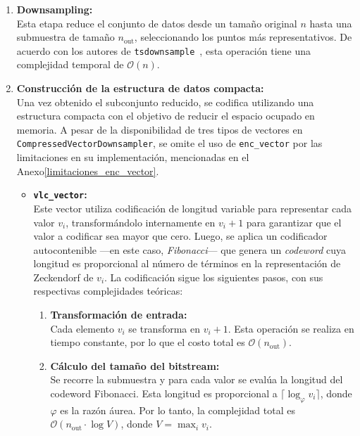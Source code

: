 \begin{enumerate}
    \item \textbf{Downsampling:} \\
    Esta etapa reduce el conjunto de datos desde un tamaño original \(n\) hasta una submuestra de tamaño \(n_{\text{out}}\), seleccionando los puntos más representativos. De acuerdo con los autores de \texttt{tsdownsample}~\cite{tsdownsample}, esta operación tiene una complejidad temporal de \(\mathcal{O}(n)\).

    \item \textbf{Construcción de la estructura de datos compacta:} \\
    Una vez obtenido el subconjunto reducido, se codifica utilizando una estructura compacta con el objetivo de reducir el espacio ocupado en memoria. A pesar de la disponibilidad de tres tipos de vectores en \texttt{CompressedVectorDownsampler}, se omite el uso de \texttt{enc\_vector} por las limitaciones en su implementación, mencionadas en el Anexo\ref{limitaciones_enc_vector}.

    \begin{itemize}
        \item \textbf{\texttt{vlc\_vector}:} \\[0.5em]
            Este vector utiliza codificación de longitud variable para representar cada valor \(v_i\), transformándolo internamente en \(v_i + 1\) para garantizar que el valor a codificar sea mayor que cero. Luego, se aplica un codificador autocontenible —en este caso, \textit{Fibonacci}— que genera un \textit{codeword} cuya longitud es proporcional al número de términos en la representación de Zeckendorf de \(v_i\). La codificación sigue los siguientes pasos, con sus respectivas complejidades teóricas:
            
            \begin{enumerate}
                \item \textbf{Transformación de entrada:} \\
                Cada elemento \(v_i\) se transforma en \(v_i + 1\). Esta operación se realiza en tiempo constante, por lo que el costo total es \(\mathcal{O}(n_{\text{out}})\).
            
                \item \textbf{Cálculo del tamaño del bitstream:} \\
                Se recorre la submuestra y para cada valor se evalúa la longitud del codeword Fibonacci. Esta longitud es proporcional a \(\lceil\log_\varphi v_i\rceil\), donde \(\varphi\) es la razón áurea. Por lo tanto, la complejidad total es \(\mathcal{O}(n_{\text{out}} \cdot \log V)\), donde \(V = \max_i v_i\).
            

\end{enumerate}
\end{itemize}
\end{enumerate}
